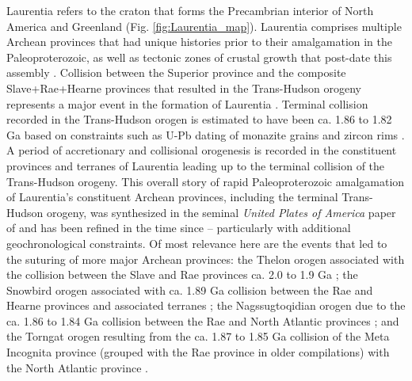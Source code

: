 \documentclass[11pt,letterpaper]{article}
\begin{document}
Laurentia refers to the craton that forms the Precambrian interior of North America and Greenland (Fig. \ref{fig:Laurentia_map}). Laurentia comprises multiple Archean provinces that had unique histories prior to their amalgamation in the Paleoproterozoic, as well as tectonic zones of crustal growth that post-date this assembly \citep{Hoffman1989a, Whitmeyer2007a}. Collision between the Superior province and the composite Slave+Rae+Hearne provinces that resulted in the Trans-Hudson orogeny represents a major event in the formation of Laurentia \citep{Corrigan2009a}. Terminal collision recorded in the Trans-Hudson orogen is estimated to have been ca. 1.86 to 1.82 Ga based on constraints such as U-Pb dating of monazite grains and zircon rims \citep[e.g.]{Skipton2016a, Weller2017a}. A period of accretionary and collisional orogenesis is recorded in the constituent provinces and terranes of Laurentia leading up to the terminal collision of the Trans-Hudson orogeny. This overall story of rapid Paleoproterozoic amalgamation of Laurentia's constituent Archean provinces, including the terminal Trans-Hudson orogeny, was synthesized in the seminal \textit{United Plates of America} paper of \citet{Hoffman1988a} and has been refined in the time since -- particularly with additional geochronological constraints. Of most relevance here are the events that led to the suturing of more major Archean provinces: the Thelon orogen associated with the collision between the Slave and Rae provinces ca. 2.0 to 1.9 Ga \citep{Hoffman1989a}; the Snowbird orogen associated with ca. 1.89 Ga collision between the Rae and Hearne provinces and associated terranes \citep{Berman2007a}; the Nagssugtoqidian orogen due to the ca. 1.86 to 1.84 Ga collision between the Rae and North Atlantic provinces \citep{St-Onge2009a}; and the Torngat orogen resulting from the ca. 1.87 to 1.85 Ga collision of the Meta Incognita province (grouped with the Rae province in older compilations) with the North Atlantic province \citep{St-Onge2009a}.
\end{document}
